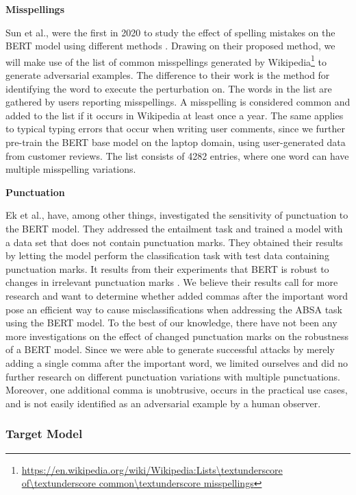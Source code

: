 \textbf{Misspellings}

Sun et al., were the first in 2020 to study the effect of spelling mistakes on the BERT model using different methods \cite{sun2020adv}. Drawing on their proposed method, we will make use of the list of common misspellings generated by Wikipedia\footnote{\url{https://en.wikipedia.org/wiki/Wikipedia:Lists\textunderscore of\textunderscore common\textunderscore misspellings}} to generate adversarial examples. The difference to their work is the method for identifying the word to execute the perturbation on. 
The words in the list are gathered by users reporting misspellings. A misspelling is considered common and added to the list if it occurs in Wikipedia at least once a year. The same applies to typical typing errors that occur when writing user comments, since we further pre-train the BERT base model on the laptop domain, using user-generated data from customer reviews. 
The list consists of 4282 entries, where one word can have multiple misspelling variations. 

\textbf{Punctuation}

Ek et al., have, among other things, investigated the sensitivity of punctuation to the BERT model. They addressed the entailment task and trained a model with a data set that does not contain punctuation marks. They obtained their results by letting the model perform the classification task with test data containing punctuation marks. It results from their experiments that BERT is robust to changes in irrelevant punctuation marks \cite{ekdoes}. We believe their results call for more research and want to determine whether added commas after the important word pose an efficient way to cause misclassifications when addressing the ABSA task using the BERT model. 
To the best of our knowledge, there have not been any more investigations on the effect of changed punctuation marks on the robustness of a BERT model. Since we were able to generate successful attacks by merely adding a single comma after the important word, we limited ourselves and did no further research on different punctuation variations with multiple punctuations. Moreover, one additional comma is unobtrusive, occurs in the practical use cases, and is not easily identified as an adversarial example by a human observer.

\subsubsection{Target Model} 
\label{sec:target_model_method}

